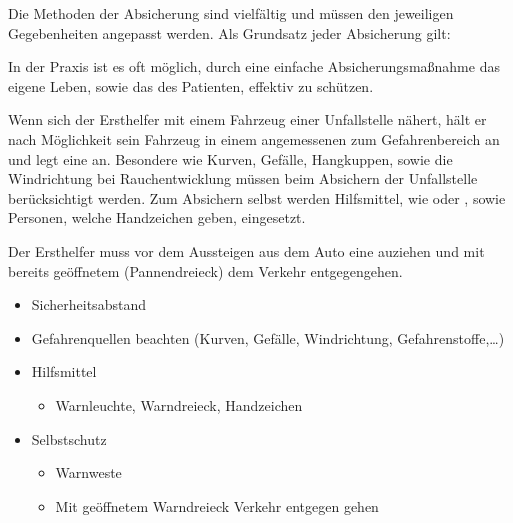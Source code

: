 {Die Methoden der Absicherung sind vielfältig und müssen den
jeweiligen Gegebenheiten angepasst werden. Als Grundsatz
jeder Absicherung gilt:
\begin{Synopsis}
\end{Synopsis}

In der Praxis ist es oft möglich, durch
eine einfache Absicherungsmaßnahme das eigene Leben, sowie
das des Patienten, effektiv zu schützen.}

{
Wenn sich der Ersthelfer mit einem Fahrzeug einer
Unfallstelle nähert, hält er nach Möglichkeit sein Fahrzeug
in einem angemessenen  zum
Gefahrenbereich an und legt eine  an. 
Besondere  wie
Kurven, Gefälle, Hangkuppen, sowie die Windrichtung bei
Rauchentwicklung müssen beim Absichern der Unfallstelle
berücksichtigt werden. Zum Absichern selbst werden
Hilfsmittel, wie  oder ,
sowie Personen, welche Handzeichen geben, eingesetzt.

Der Ersthelfer muss vor dem Aussteigen aus dem Auto
eine  auziehen und mit bereits
geöffnetem  (Pannendreieck) dem 
Verkehr entgegengehen. 
}{
\begin{itemize}
  \item Sicherheitsabstand
  \item Gefahrenquellen beachten (Kurven, Gefälle,
  Windrichtung, Gefahrenstoffe,\ldots)
  \item Hilfsmittel
  \begin{itemize}
    \item Warnleuchte, Warndreieck, Handzeichen
  \end{itemize}
  \item Selbstschutz
  \begin{itemize}
    \item Warnweste
    \item Mit geöffnetem Warndreieck
    Verkehr entgegen gehen
  \end{itemize}
\end{itemize}
}{}{}{}


\begin{Synopsis}
\end{Synopsis}




